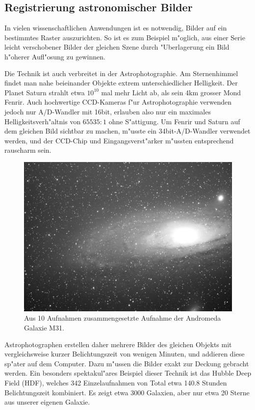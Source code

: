%
%
%
\subsection{Registrierung astronomischer Bilder}
In vielen wissenschaftlichen Anwendungen ist es notwendig, Bilder auf
ein bestimmtes Raster auszurichten. So ist es zum Beispiel m"oglich,
aus einer Serie leicht verschobener Bilder der gleichen Szene durch
"Uberlagerung ein Bild h"oherer Aufl"osung zu gewinnen.

Die Technik ist auch verbreitet in der Astrophotographie. Am Sternenhimmel
findet man nahe beieinander Objekte extrem unterschiedlicher Helligkeit.
Der Planet Saturn strahlt etwa $10^{10}$ mal mehr Licht ab, als sein
4km grosser Mond Fenrir.
Auch hochwertige CCD-Kameras f"ur Astrophotographie verwenden jedoch nur
A/D-Wandler mit 16bit, erlauben also nur ein maximales
Helligkeitsverh"altnis von $65535 : 1$ ohne S"attigung.
Um Fenrir und Saturn auf dem gleichen Bild sichtbar zu machen, m"usste
ein 34bit-A/D-Wandler verwendet werden, und der CCD-Chip und
Eingangsverst"arker m"ussten entsprechend rauscharm sein.

\begin{figure}
\begin{center}
\includegraphics[width=\hsize]{graphics/andromeda-gimped.jpg}
\end{center}
\caption{Aus 10 Aufnahmen zusammengesetzte Aufnahme der Andromeda Galaxie
M31.\label{andromeda-image}}
\end{figure}

Astrophotographen erstellen daher mehrere Bilder des gleichen Objekts
mit vergleichsweise kurzer Belichtungszeit von wenigen Minuten, und
addieren diese sp"ater auf dem Computer. Dazu m"ussen die Bilder
exakt zur Deckung gebracht werden.
Ein besonders spektakul"ares Beispiel dieser Technik ist das Hubble
Deep Field (HDF), welches 342 Einzelaufnahmen von Total
etwa 140.8 Stunden Belichtungszeit kombiniert.
Es zeigt etwa 3000 Galaxien, aber nur etwa 20 Sterne aus unserer eigenen
Galaxie. 

